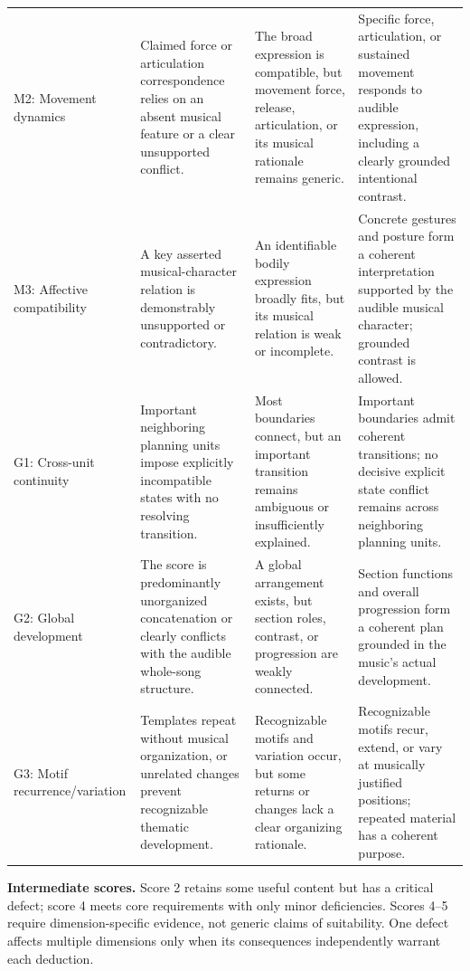 \begin{table}[!htbp]
\begin{tabular}{@{}>{\raggedright\arraybackslash}p{}p{}p{}p{}@{}}
\addlinespace
M2: Movement dynamics & Claimed force or articulation correspondence relies on an absent musical feature or a clear unsupported conflict. & The broad expression is compatible, but movement force, release, articulation, or its musical rationale remains generic. & Specific force, articulation, or sustained movement responds to audible expression, including a clearly grounded intentional contrast. \\
\addlinespace
M3: Affective compatibility & A key asserted musical-character relation is demonstrably unsupported or contradictory. & An identifiable bodily expression broadly fits, but its musical relation is weak or incomplete. & Concrete gestures and posture form a coherent interpretation supported by the audible musical character; grounded contrast is allowed. \\
\midrule
G1: Cross-unit continuity & Important neighboring planning units impose explicitly incompatible states with no resolving transition. & Most boundaries connect, but an important transition remains ambiguous or insufficiently explained. & Important boundaries admit coherent transitions; no decisive explicit state conflict remains across neighboring planning units. \\
\addlinespace
G2: Global development & The score is predominantly unorganized concatenation or clearly conflicts with the audible whole-song structure. & A global arrangement exists, but section roles, contrast, or progression are weakly connected. & Section functions and overall progression form a coherent plan grounded in the music's actual development. \\
\addlinespace
G3: Motif recurrence/variation & Templates repeat without musical organization, or unrelated changes prevent recognizable thematic development. & Recognizable motifs and variation occur, but some returns or changes lack a clear organizing rationale. & Recognizable motifs recur, extend, or vary at musically justified positions; repeated material has a coherent purpose. \\
\bottomrule
\end{tabular}
\par\vspace{5pt}
\begin{minipage}{\textwidth}\footnotesize
\textbf{Intermediate scores.} Score 2 retains some useful content but has a critical defect; score 4 meets core requirements with only minor deficiencies. Scores 4--5 require dimension-specific evidence, not generic claims of suitability. One defect affects multiple dimensions only when its consequences independently warrant each deduction.

\end{minipage}
\end{table}
